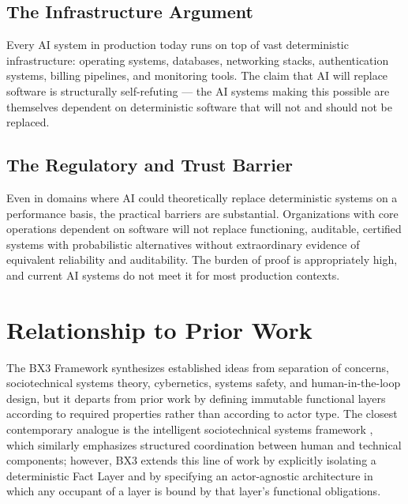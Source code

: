 \documentclass[12pt]{article}
\begin{document}
\subsection{The Infrastructure Argument}

Every AI system in production today runs on top of vast deterministic infrastructure: operating systems, databases, networking stacks, authentication systems, billing pipelines, and monitoring tools. The claim that AI will replace software is structurally self-refuting --- the AI systems making this possible are themselves dependent on deterministic software that will not and should not be replaced.

\subsection{The Regulatory and Trust Barrier}

Even in domains where AI could theoretically replace deterministic systems on a performance basis, the practical barriers are substantial. Organizations with core operations dependent on software will not replace functioning, auditable, certified systems with probabilistic alternatives without extraordinary evidence of equivalent reliability and auditability. The burden of proof is appropriately high, and current AI systems do not meet it for most production contexts.

\section{Relationship to Prior Work}
\label{sec:prior}

The BX3 Framework synthesizes established ideas from separation of concerns, sociotechnical systems theory, cybernetics, systems safety, and human-in-the-loop design, but it departs from prior work by defining immutable functional layers according to required properties rather than according to actor type. The closest contemporary analogue is the intelligent sociotechnical systems framework \cite{xu2024}, which similarly emphasizes structured coordination between human and technical components; however, BX3 extends this line of work by explicitly isolating a deterministic Fact Layer and by specifying an actor-agnostic architecture in which any occupant of a layer is bound by that layer's functional obligations.
\end{document}
